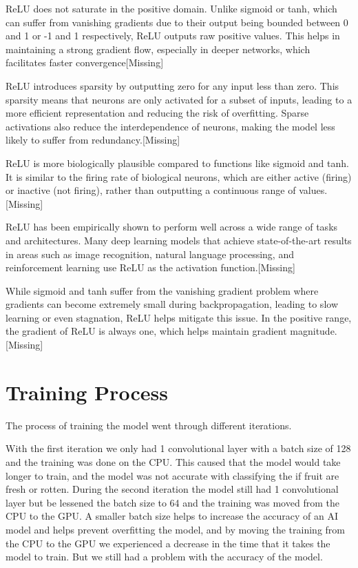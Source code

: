 \documentclass[conference]{IEEEtran}
\begin{document}
ReLU does not saturate in the positive domain. Unlike sigmoid or tanh, which can suffer from vanishing gradients due to their output being bounded between 0 and 1 or -1 and 1 respectively, ReLU outputs raw positive values. This helps in maintaining a strong gradient flow, especially in deeper networks, which facilitates faster convergence[Missing]

ReLU introduces sparsity by outputting zero for any input less than zero. This sparsity means that neurons are only activated for a subset of inputs, leading to a more efficient representation and reducing the risk of overfitting. Sparse activations also reduce the interdependence of neurons, making the model less likely to suffer from redundancy.[Missing]

ReLU is more biologically plausible compared to functions like sigmoid and tanh. It is similar to the firing rate of biological neurons, which are either active (firing) or inactive (not firing), rather than outputting a continuous range of values.[Missing]

ReLU has been empirically shown to perform well across a wide range of tasks and architectures. Many deep learning models that achieve state-of-the-art results in areas such as image recognition, natural language processing, and reinforcement learning use ReLU as the activation function.[Missing]

While sigmoid and tanh suffer from the vanishing gradient problem where gradients can become extremely small during backpropagation, leading to slow learning or even stagnation, ReLU helps mitigate this issue. In the positive range, the gradient of ReLU is always one, which helps maintain gradient magnitude.[Missing]

\section{Training Process}

The process of training the model went through different iterations.

With the first iteration we only had 1 convolutional layer with a batch size of 128 and the training was done on the CPU. This caused that the model would take longer to train, and the model was not accurate with classifying the if fruit are fresh or rotten. During the second iteration the model still had 1 convolutional layer but be lessened the batch size to 64 and the training was moved from the CPU to the GPU. A smaller batch size helps to increase the accuracy of an AI model \cite{b2} and helps prevent overfitting the model, and by moving the training from the CPU to the GPU we experienced a decrease in the time that it takes the model to train. But we still had a problem with the accuracy of the model.
\end{document}
